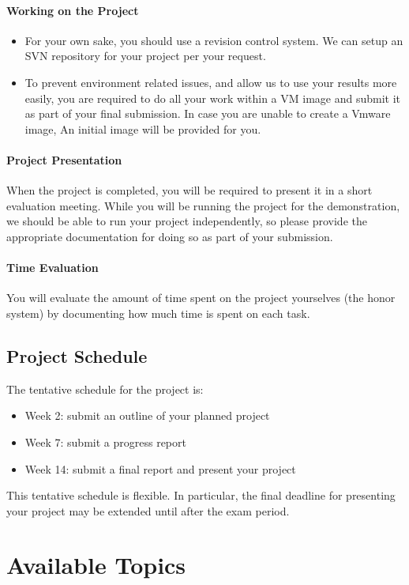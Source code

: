 \documentclass[english]{article}
\begin{document}
\paragraph{Working on the Project}
\begin{itemize}
\item For your own sake, you should use a revision control system. We can setup an SVN repository for your project per your request.
\item To prevent environment related issues, and allow us to use your results more easily, you are required to do all your work within a VM image and submit it as part of your final submission. In case you are unable to create a Vmware image, An initial image will be provided for you.
\end{itemize}
\paragraph{Project Presentation} When the project is completed, you will be required to present it in a short evaluation meeting. While you will be running the project for the demonstration, we should be able to run your project independently, so please provide the appropriate documentation for doing so as part of your submission.
\paragraph{Time Evaluation} You will evaluate the amount of time spent on the project yourselves (the honor system) by documenting how much time is spent on each task.

\subsection{Project Schedule}
The tentative schedule for the project is:
\begin{itemize}
\item Week 2: submit an outline of your planned project
\item Week 7: submit a progress report
\item Week 14: submit a final report and present your project
\end{itemize}
This tentative schedule is flexible. In particular, the final deadline for presenting your project may be extended until after the exam period.

\newpage
\section{Available Topics}
\end{document}
